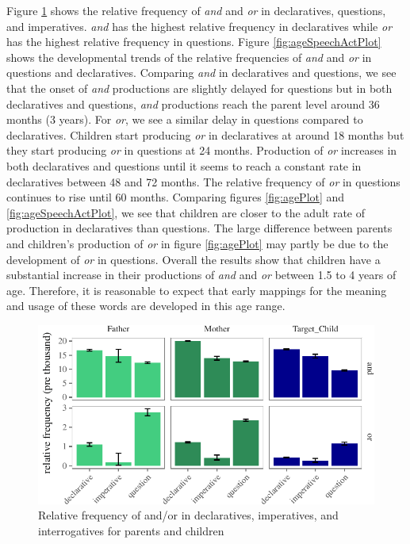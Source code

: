 \documentclass[oneside]{report}
\theoremstyle{definition}
\theoremstyle{definition}
\theoremstyle{definition}
\theoremstyle{remark}
\begin{document}
Figure \ref{fig:freqTablebySpeechAct} shows the relative frequency of
\emph{and} and \emph{or} in declaratives, questions, and imperatives.
\emph{and} has the highest relative frequency in declaratives while
\emph{or} has the highest relative frequency in questions. Figure
\ref{fig:ageSpeechActPlot} shows the developmental trends of the
relative frequencies of \emph{and} and \emph{or} in questions and
declaratives. Comparing \emph{and} in declaratives and questions, we see
that the onset of \emph{and} productions are slightly delayed for
questions but in both declaratives and questions, \emph{and} productions
reach the parent level around 36 months (3 years). For \emph{or}, we see
a similar delay in questions compared to declaratives. Children start
producing \emph{or} in declaratives at around 18 months but they start
producing \emph{or} in questions at 24 months. Production of \emph{or}
increases in both declaratives and questions until it seems to reach a
constant rate in declaratives between 48 and 72 months. The relative
frequency of \emph{or} in questions continues to rise until 60 months.
Comparing figures \ref{fig:agePlot} and \ref{fig:ageSpeechActPlot}, we
see that children are closer to the adult rate of production in
declaratives than questions. The large difference between parents and
children's production of \emph{or} in figure \ref{fig:agePlot} may
partly be due to the development of \emph{or} in questions. Overall the
results show that children have a substantial increase in their
productions of \emph{and} and \emph{or} between 1.5 to 4 years of age.
Therefore, it is reasonable to expect that early mappings for the
meaning and usage of these words are developed in this age range.
\begin{figure}[tb]

{\centering \includegraphics{figs/freqTablebySpeechAct-1} 

}

\caption{Relative frequency of and/or in declaratives, imperatives, and interrogatives for parents and children }\label{fig:freqTablebySpeechAct}
\end{figure}
\end{document}
